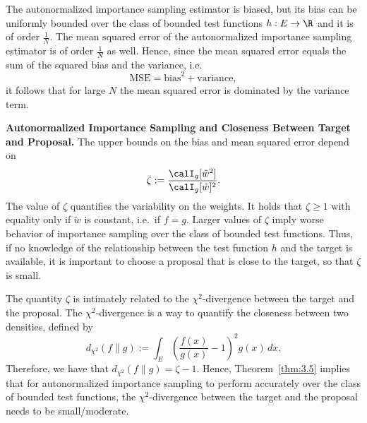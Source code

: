 \begin{remark}
\label{rem:3.6}
The autonormalized importance sampling estimator is biased, but its bias can be
uniformly bounded over the class of bounded test functions $h : E \to \R$ and it
is of order $\tfrac{1}{N}$. The mean squared error of the autonormalized
importance sampling estimator is of order $\tfrac{1}{N}$ as well. Hence, since
the mean squared error equals the sum of the squared bias and the variance,
i.e.\
\[
  \mathrm{MSE} = \mathrm{bias}^2 + \mathrm{variance},
\]
it follows that for large $N$ the mean squared error is dominated by the
variance term.
\end{remark}

\medskip
\noindent\textbf{Autonormalized Importance Sampling and Closeness Between Target
and Proposal.}
The upper bounds on the bias and mean squared error depend on
\[
  \zeta := \frac{\calI_g[\tilde{w}^2]}{\calI_g[\tilde{w}]^2}.
\]
The value of $\zeta$ quantifies the variability on the weights. It holds that
$\zeta \geq 1$ with equality only if $\tilde{w}$ is constant, i.e.\ if $f = g$.
Larger values of $\zeta$ imply worse behavior of importance sampling over the
class of bounded test functions. Thus, if no knowledge of the relationship
between the test function $h$ and the target is available, it is important to
choose a proposal that is close to the target, so that $\zeta$ is small.

The quantity $\zeta$ is intimately related to the $\chi^2$-divergence between
the target and the proposal. The $\chi^2$-divergence is a way to quantify the
closeness between two densities, defined by
\[
  d_{\chi^2}(f\|g)
  := \int_E \left(\frac{f(x)}{g(x)} - 1\right)^2 g(x)\,dx.
\]
Therefore, we have that $d_{\chi^2}(f\|g) = \zeta - 1$. Hence,
Theorem~\ref{thm:3.5} implies that for autonormalized importance sampling to
perform accurately over the class of bounded test functions, the
$\chi^2$-divergence between the target and the proposal needs to be
small/moderate.


